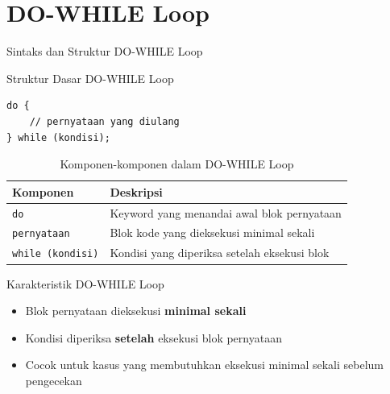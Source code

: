 \documentclass{beamer}
\begin{document}
\section{DO-WHILE Loop}
\begin{frame}[fragile]{Sintaks dan Struktur DO-WHILE Loop}
  \begin{block}{Struktur Dasar DO-WHILE Loop}
    \begin{lstlisting}
do {
    // pernyataan yang diulang
} while (kondisi);
    \end{lstlisting}
  \end{block}
  
  \vspace{-0.3cm}
  \begin{table}
    \footnotesize
    \begin{tabular}{p{}|p{}}
    \textbf{Komponen} & \textbf{Deskripsi} \\
    \hline
    \rowcolor{lightgray}
    \texttt{do} & Keyword yang menandai awal blok pernyataan \\
    \rowcolor{white}
    \texttt{pernyataan} & Blok kode yang dieksekusi minimal sekali \\
    \rowcolor{lightgray}
    \texttt{while (kondisi)} & Kondisi yang diperiksa setelah eksekusi blok \\
    \end{tabular}
    \caption{Komponen-komponen dalam DO-WHILE Loop}
  \end{table}

  \vspace{-0.4cm}
  \begin{block}{Karakteristik DO-WHILE Loop}
    \begin{itemize}
      \footnotesize
      \item Blok pernyataan dieksekusi \textbf{minimal sekali}
      \item Kondisi diperiksa \textbf{setelah} eksekusi blok pernyataan
      \item Cocok untuk kasus yang membutuhkan eksekusi minimal sekali sebelum pengecekan
    \end{itemize}
  \end{block}
\end{frame}
\end{document}
